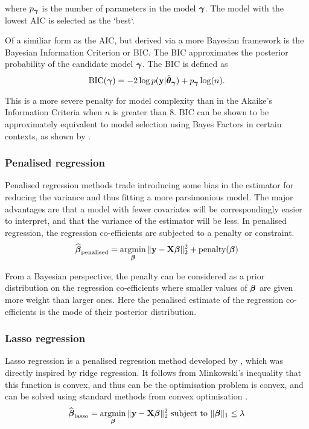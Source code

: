 \noindent where $p_{\boldsymbol \gamma}$ is the number of parameters in the model ${\boldsymbol \gamma}$. The model with the lowest AIC
is selected as the `best`.

Of a similiar form as the AIC, but derived via a more Bayesian framework is the Bayesian Information Criterion
or BIC. The BIC approximates the posterior probability of the candidate model ${\boldsymbol \gamma}$. The BIC is defined as
$$
	\text{BIC}({\boldsymbol \gamma}) = -2 \log p({\bf y} | \hat{{\boldsymbol \theta}}_{\boldsymbol \gamma}) + p_{\boldsymbol \gamma} \log(n).
$$

\noindent This is a more severe penalty for model complexity than in the Akaike's Information Criteria when
$n$ is greater than $8$. BIC can be shown to be approximately equivalent to model selection using Bayes
Factors in certain contexts, as shown by \cite{Kass1993}.

\subsubsection{Penalised regression}
Penalised regression methods trade introducing some bias in the estimator for reducing the variance and thus
fitting a more parsimonious model. The major advantages are that a model with fewer covariates will be
correspondingly easier to interpret, and that the variance of the estimator will be less. In penalised
regression, the regression co-efficients are subjected to a penalty or constraint.
$$
\widehat{\vbeta}_{\text{penalised}} = \argmin_\vbeta \|\vy - \mX \vbeta\|_2^2 + \text{penalty}(\vbeta)
$$

From a Bayesian perspective, the penalty can be considered as a prior distribution on the regression 
co-efficients where smaller values of ${\boldsymbol \beta}$ are given more weight than larger ones. Here the penalised
estimate of the regression co-efficients is the mode of their posterior distribution.

\subsubsection{Lasso regression}
Lasso regression is a penalised regression method developed by \citep{Tibshirani1996}, which was directly
inspired by ridge regression. It follows from Minkowski's inequality that this function is convex, and thus
can be the optimisation problem is convex, and can be solved using standard methods from convex optimisation
\citep{Boyd2010}.
$$
\widehat{\vbeta}_{\text{lasso}} = \argmin_\vbeta \|\vy - \mX \vbeta\|_2^2 \text{ subject to } \|\vbeta\|_1 \leq \lambda
$$

